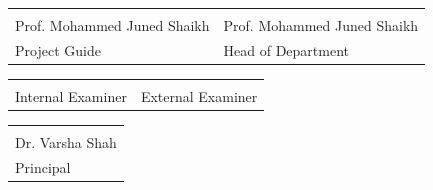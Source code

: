 \documentclass[12pt,a4paper,openany]{report}
\begin{document}
	\begin{flushleft}
		\begin{tabular}{p{8cm} p{8cm}}
			\underline{\hspace{5cm}} & \underline{\hspace{5cm}} \\
			Prof. Mohammed Juned Shaikh & Prof. Mohammed Juned Shaikh \\
			Project Guide & Head of Department \\
		\end{tabular}
		
		\vspace{1.5cm}
		
		\begin{tabular}{p{8cm} p{8cm}}
			\underline{\hspace{5cm}} & \underline{\hspace{5cm}} \\
			Internal Examiner & External Examiner \\
		\end{tabular}
		
		\vspace{1.5cm}
		
		\centering
		\begin{tabular}{p{6cm}}
			\underline{\hspace{5cm}} \\
			Dr. Varsha Shah \\
			Principal \\
		\end{tabular}
		
	\end{flushleft}
	
	\vspace*{\fill}
	
	
	
	
	
	
	
	
	
	
	
	
	
	
	
	
\end{document}

